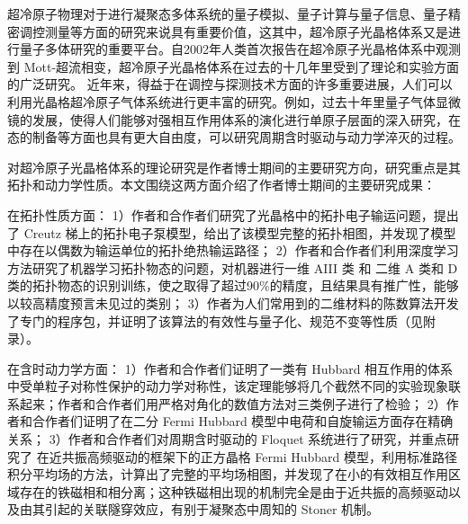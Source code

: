 \begin{cabstract}
超冷原子物理对于进行凝聚态多体系统的量子模拟、量子计算与量子信息、量子精密调控测量等方面的研究来说具有重要价值，这其中，超冷原子光晶格体系又是进行量子多体研究的重要平台。自2002年人类首次报告在超冷原子光晶格体系中观测到 Mott-超流相变，超冷原子光晶格体系在过去的十几年里受到了理论和实验方面的广泛研究。
近年来，得益于在调控与探测技术方面的许多重要进展，人们可以利用光晶格超冷原子气体系统进行更丰富的研究。例如，过去十年里量子气体显微镜的发展，使得人们能够对强相互作用体系的演化进行单原子层面的深入研究，在态的制备等方面也具有更大自由度，可以研究周期含时驱动与动力学淬灭的过程。

对超冷原子光晶格体系的理论研究是作者博士期间的主要研究方向，研究重点是其拓扑和动力学性质。本文围绕这两方面介绍了作者博士期间的主要研究成果：

在拓扑性质方面：
1）作者和合作者们研究了光晶格中的拓扑电子输运问题，提出了 Creutz 梯上的拓扑电子泵模型，给出了该模型完整的拓扑相图，并发现了模型中存在以偶数为输运单位的拓扑绝热输运路径；
2）作者和合作者们利用深度学习方法研究了机器学习拓扑物态的问题，对机器进行一维 AIII 类 和 二维 A 类和 D 类的拓扑物态的识别训练，使之取得了超过90\%的精度，且结果具有推广性，能够以较高精度预言未见过的类别；
3）作者为人们常用到的二维材料的陈数算法\cite{chern2005}开发了专门的程序包，并证明了该算法的有效性与量子化、规范不变等性质（见附录）。

在含时动力学方面：
1）作者和合作者们证明了一类有 Hubbard 相互作用的体系中受单粒子对称性保护的动力学对称性，该定理能够将几个截然不同的实验现象\cite{hubbard-expan-2010,hubbard-expan-2012,mbl1d,twobody-2017}联系起来；作者和合作者们用严格对角化的数值方法对三类例子进行了检验；
2）作者和合作者们证明了在二分 Fermi Hubbard 模型中电荷和自旋输运方面存在精确关系；
3）作者和合作者们对周期含时驱动的 Floquet 系统进行了研究，并重点研究了
在近共振高频驱动的框架下的正方晶格 Fermi Hubbard 模型，利用标准路径积分平均场的方法，计算出了完整的平均场相图，并发现了在小的有效相互作用区域存在的铁磁相和相分离；这种铁磁相出现的机制完全是由于近共振的高频驱动以及由其引起的关联隧穿效应，有别于凝聚态中周知的 Stoner 机制。
\end{cabstract}


